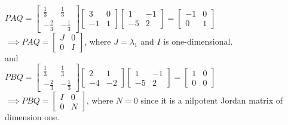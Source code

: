 \begin{center}
    $PAQ = \begin{bmatrix} \frac{1}{3} & \frac{1}{3} \\ -\frac{2}{3} & -\frac{1}{3} \end{bmatrix}
    \begin{bmatrix} 3 & 0 \\ -1 & 1 \end{bmatrix}
    \begin{bmatrix} 1 & -1 \\ -5 & 2 \end{bmatrix} = \begin{bmatrix} -1 & 0 \\ 0 & 1 \end{bmatrix}$ \\
    \vspace{1em}
    $\implies PAQ = \begin{bmatrix} J & 0 \\ 0 & I \end{bmatrix}$, where $J = \lambda_1$ and $I$ is one-dimensional. \\
    \vspace{1em}
    and \\
    \vspace{1em}
    $PBQ = \begin{bmatrix} \frac{1}{3} & \frac{1}{3} \\ -\frac{2}{3} & -\frac{1}{3} \end{bmatrix}
    \begin{bmatrix} 2 & 1 \\ -4 & -2 \end{bmatrix}
    \begin{bmatrix} 1 & -1 \\ -5 & 2 \end{bmatrix} = \begin{bmatrix} 1 & 0 \\ 0 & 0 \end{bmatrix}$
    \\
    \vspace{1em}
    $\implies PBQ = \begin{bmatrix} I & 0 \\ 0 & N \end{bmatrix}$, where $N = 0$ since it is a nilpotent Jordan matrix of dimension one.
\end{center}